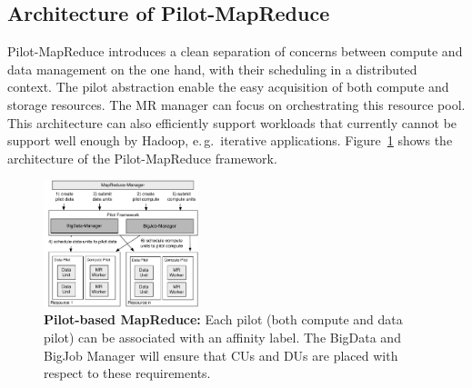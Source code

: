 \documentclass{acm_proc_article-sp}
\newcommand{\pilotmapreduce}{Pilot-MapReduce\xspace}
\begin{document}


\subsection{Architecture of \pilotmapreduce}
\pilotmapreduce introduces a clean separation of concerns between
compute and data management on the one hand, with their scheduling in
a distributed context. The pilot abstraction enable the easy
acquisition of both compute and storage resources. The MR manager can
focus on orchestrating this resource pool. This architecture can also
efficiently support workloads that currently cannot be support well
enough by Hadoop, e.\,g.\ iterative
applications. Figure~\ref{fig:figures_mapreduce-pilotdata} shows the
architecture of the \pilotmapreduce framework.

\begin{figure}[htbp]
	\centering
	\includegraphics[width=0.4\textwidth]{figures/mapreduce-pilotdata.pdf}
	\caption{\textbf{Pilot-based MapReduce:} Each pilot (both compute and data 
	pilot) can be associated with an affinity label. The BigData and BigJob 
	Manager will ensure that CUs and DUs are placed with respect to these 
	requirements.}
	\label{fig:figures_mapreduce-pilotdata}
\end{figure}
\end{document}
